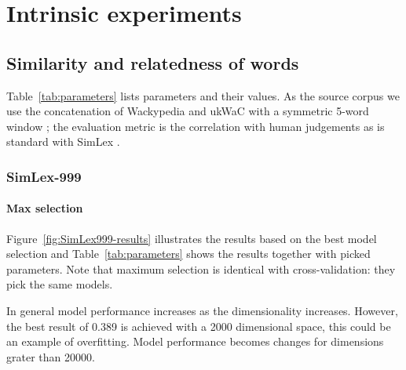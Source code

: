 \chapter{Intrinsic experiments}
\label{cha:experiments}

\section{Similarity and relatedness of words}
\label{sec:lexical}

Table~\ref{tab:parameters} lists parameters and their values. As the source corpus we use the concatenation of Wackypedia and ukWaC \cite{ukwac} with a symmetric 5-word window \cite{milajevs-EtAl:2014:EMNLP2014}; the evaluation metric is the correlation with human judgements as is standard with SimLex \cite{hill2014simlex}.


\subsection{SimLex-999}
\label{sec:simlex-999}



\subsubsection{Max selection}
\label{sec:max-selection-simlex}

Figure~\ref{fig:SimLex999-results} illustrates the results based on the best model selection and Table~\ref{tab:parameters} shows the results together with picked parameters. Note that maximum selection is identical with cross-validation: they pick the same models.

In general model performance increases as the dimensionality increases. However, the best result of 0.389 is achieved with a 2000 dimensional space, this could be an example of overfitting. Model performance becomes changes for dimensions grater than 20000.

